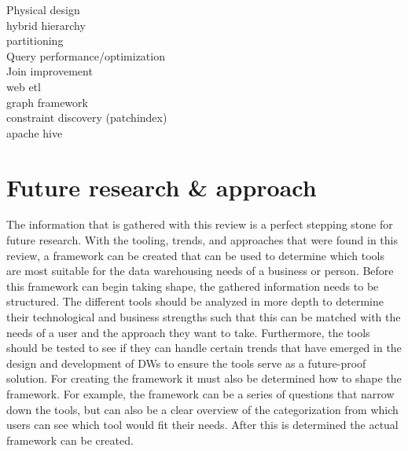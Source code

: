 \documentclass[11pt]{article}
\begin{document}
Physical design \cite{Raman2023343, Ramdane2022, Ramdane2019189, Ramdane2019255, Ramdane2022107, Liu202052, Du2019211} \\
hybrid hierarchy \cite{Nie2021135} \\
partitioning \cite{Kechar2019, Ferro2019221} \\

Query performance/optimization \cite{Wang202014, Wang20231315, Raipurkar20216191, Grigoriev2021147, Abbasi201863} \\
Join improvement \cite{Aziz202141261, Toumi2019, Garain2019278} \\
web etl \cite{AbdAl-Rahman2023765}\\
graph framework \cite{Khalil2022547} \\

constraint discovery (patchindex) \cite{Kläbe2021833, Klabe20211991} \\
apache hive \cite{Camacho-Rodríguez20191773}

\section{Future research \& approach}
\label{approach}
The information that is gathered with this review is a perfect stepping stone for future research. With the tooling, trends, and approaches that were found in this review, a framework can be created that can be used to determine which tools are most suitable for the data warehousing needs of a business or person. Before this framework can begin taking shape, the gathered information needs to be structured. The different tools should be analyzed in more depth to determine their technological and business strengths such that this can be matched with the needs of a user and the approach they want to take. Furthermore, the tools should be tested to see if they can handle certain trends that have emerged in the design and development of DWs to ensure the tools serve as a future-proof solution. For creating the framework it must also be determined how to shape the framework. For example, the framework can be a series of questions that narrow down the tools, but can also be a clear overview of the categorization from which users can see which tool would fit their needs. After this is determined the actual framework can be created. \\
\end{document}
